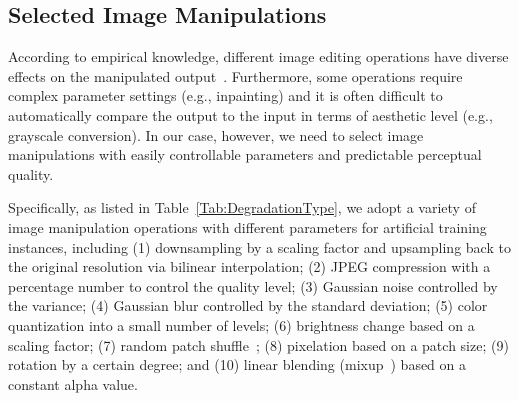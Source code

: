\documentclass[letterpaper]{article}
\begin{document}
\subsection{Selected Image Manipulations}
\label{sec:selected_image_manipulations}

According to empirical knowledge, different image editing operations have diverse effects on the manipulated output~\cite{ma2018end2end,zhang2018perceptual}.
Furthermore, some operations require complex parameter settings (e.g., inpainting) and it is often difficult to automatically compare the output to the input in terms of aesthetic level (e.g., grayscale conversion).
In our case, however, we need to select image manipulations with easily controllable parameters and predictable perceptual quality.

Specifically, as listed in Table~\ref{Tab:DegradationType}, we adopt a variety of image manipulation operations with different parameters for artificial training instances, including (1) downsampling by a scaling factor and upsampling back to the original resolution via bilinear interpolation; (2) JPEG compression with a percentage number to control the quality level; (3) Gaussian noise controlled by the variance; (4) Gaussian blur controlled by the standard deviation; (5) color quantization into a small number of levels; (6) brightness change based on a scaling factor; (7) random patch shuffle~\cite{kang2017patchshuffle}; (8) pixelation based on a patch size; (9) rotation by a certain degree; and (10) linear blending (mixup~\cite{zhang2017mixup}) based on a constant alpha value.

\begin{table}
    \centering
    \caption{Image editing operations and the parameters adopted to construct meaningful pretext tasks.
    }
    \label{Tab:DegradationType}
\end{table}
\end{document}
